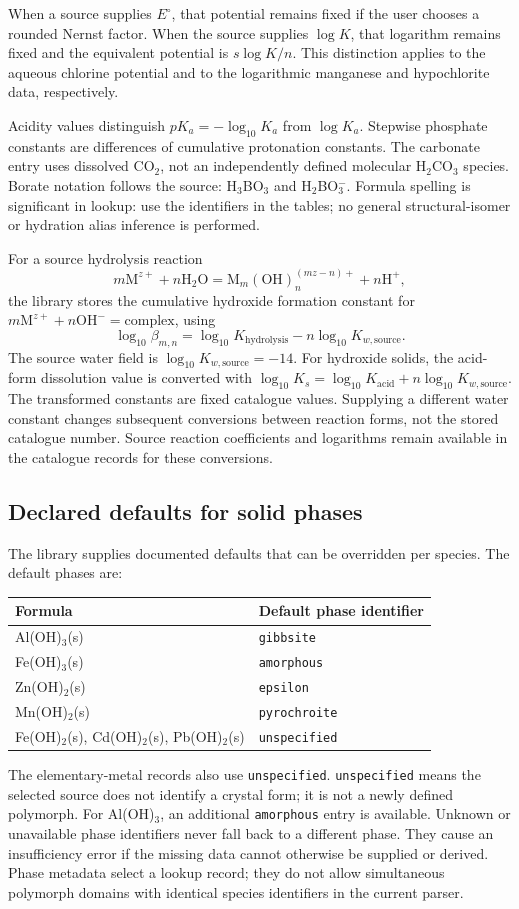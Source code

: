 \documentclass[a4paper,11pt]{ltxdoc}
\begin{document}
When a source supplies $E^\circ$, that potential remains fixed if the user chooses
a rounded Nernst factor. When the source supplies $\log K$, that logarithm remains
fixed and the equivalent potential is $s\log K/n$. This distinction applies to
the aqueous chlorine potential and to the logarithmic manganese and hypochlorite
data, respectively.

Acidity values distinguish $pK_a=-\log_{10}K_a$ from $\log K_a$. Stepwise phosphate
constants are differences of cumulative protonation constants. The carbonate
entry uses dissolved CO$_2$, not an independently defined molecular H$_2$CO$_3$
species. Borate notation follows the source: H$_3$BO$_3$ and H$_2$BO$_3^-$.
Formula spelling is significant in lookup: use the identifiers in the tables;
no general structural-isomer or hydration alias inference is performed.

For a source hydrolysis reaction
\[
 m\mathrm M^{z+}+n\mathrm{H_2O}
 =\mathrm M_m(\mathrm{OH})_n^{(mz-n)+}+n\mathrm H^+,
\]
the library stores the cumulative hydroxide formation constant for
$m\mathrm M^{z+}+n\mathrm{OH^-}=\text{complex}$, using
\[
 \log_{10}\beta_{m,n}
 =\log_{10}K_{\mathrm{hydrolysis}}-n\log_{10}K_{w,\mathrm{source}}.
\]
The source water field is $\log_{10}K_{w,\mathrm{source}}=-14$. For hydroxide
solids, the acid-form dissolution value is converted with
$\log_{10}K_s=\log_{10}K_{\mathrm{acid}}+n\log_{10}K_{w,\mathrm{source}}$.
The transformed constants are fixed catalogue values. Supplying a different
water constant changes subsequent conversions between reaction forms, not the
stored catalogue number. Source reaction coefficients and logarithms remain
available in the catalogue records for these conversions.

\subsection{Declared defaults for solid phases}
The library supplies documented defaults that can be overridden per species.
The default phases are:
\begin{center}
\begin{tabular}{ll}
Formula & Default phase identifier\\\hline
Al(OH)$_3$(s) & \texttt{gibbsite}\\
Fe(OH)$_3$(s) & \texttt{amorphous}\\
Zn(OH)$_2$(s) & \texttt{epsilon}\\
Mn(OH)$_2$(s) & \texttt{pyrochroite}\\
Fe(OH)$_2$(s), Cd(OH)$_2$(s), Pb(OH)$_2$(s) & \texttt{unspecified}
\end{tabular}
\end{center}
The elementary-metal records also use \texttt{unspecified}.
\texttt{unspecified} means the selected source does not identify a crystal form;
it is not a newly defined polymorph. For Al(OH)$_3$, an additional
\texttt{amorphous} entry is available. Unknown or unavailable phase identifiers
never fall back to a different phase. They cause an insufficiency error if the
missing data cannot otherwise be supplied or derived. Phase metadata select a
lookup record; they do not allow simultaneous polymorph domains with identical
species identifiers in the current parser.
\end{document}
